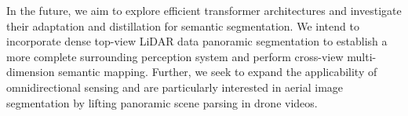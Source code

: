 \documentclass[journal]{IEEEtran}
\begin{document}
In the future, we aim to explore efficient transformer architectures and investigate their adaptation and distillation for semantic segmentation.
We intend to incorporate dense  top-view LiDAR data panoramic segmentation to establish a more complete surrounding perception system and perform cross-view multi-dimension semantic mapping.
Further, we seek to expand the applicability of omnidirectional sensing and are particularly interested in aerial image segmentation by lifting panoramic scene parsing in drone videos.



\end{document}
